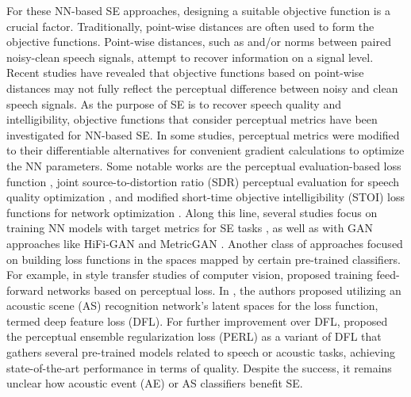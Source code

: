 \documentclass[a4paper]{article}
\begin{document}
For these NN-based SE approaches, designing a suitable objective function is a crucial factor. Traditionally, point-wise distances are often used to form the objective functions. Point-wise distances, such as  and/or  norms between paired noisy-clean speech signals, attempt to recover information on a signal level. Recent studies have revealed that objective functions based on point-wise distances may not fully reflect the perceptual difference between noisy and clean speech signals. As the purpose of SE is to recover speech quality and intelligibility, objective functions that consider perceptual metrics have been investigated for NN-based SE. In some studies, perceptual metrics were modified to their differentiable alternatives for convenient gradient calculations to optimize the NN parameters. Some notable works are the perceptual evaluation-based loss function \cite{martin2018deep}, joint source-to-distortion ratio (SDR) perceptual evaluation for speech quality optimization \cite{kim2019end}, and modified short-time objective intelligibility (STOI) loss functions for network optimization \cite{fu2018end, kolbaek2018monaural, zhao2018perceptually}. Along this line, several studies focus on training NN models with target metrics for SE tasks \cite{fu2019learning}, as well as with GAN approaches like HiFi-GAN \cite{su2020hifi} and MetricGAN \cite{fu2019metricgan}.
Another class of approaches focused on building loss functions in the spaces mapped by certain pre-trained classifiers. 
For example, in style transfer studies of computer vision, \cite{johnson2016perceptual} proposed training feed-forward networks based on perceptual loss. In \cite{germain2019speech}, the authors proposed utilizing an acoustic scene (AS) recognition network's latent spaces for the loss function, termed deep feature loss (DFL). For further improvement over DFL, \cite{kataria2020perceptual} proposed the perceptual ensemble regularization loss (PERL) as a variant of DFL that gathers several pre-trained models related to speech or acoustic tasks, achieving state-of-the-art performance in terms of quality. Despite the success, it remains unclear how acoustic event (AE) or AS classifiers benefit SE. \par
\end{document}
